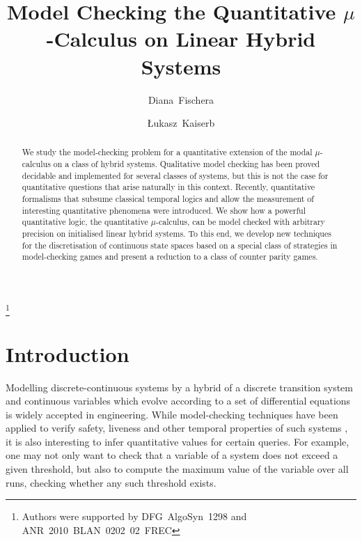 \documentclass[fleqn,envcountsame]{LMCS}
\begin{document}
\title[Model Checking the Quantitative $\mu$-Calculus on
  Linear Hybrid Systems]{Model Checking the Quantitative $\mu$-Calculus on
  Linear Hybrid Systems}
\author[D.~Fischer]{Diana~Fischer\rsuper a}
\address{{\lsuper a}Mathematische Grundlagen der Informatik, RWTH Aachen University}

\author[\L.~~Kaiser]{\L{}ukasz~Kaiser\rsuper b}
\address{{\lsuper b}LIAFA, CNRS \& Universit{\'e} Paris Diderot -- Paris 7}

\thanks{Authors were supported by DFG~AlgoSyn~1298 and
  ANR~2010~BLAN~0202~02~FREC}


\begin{abstract}
We study the model-checking problem for a quantitative
extension of the modal $\mu$-calculus on a class of hybrid systems.
Qualitative model checking has been proved decidable and implemented for
several classes of systems, but this is not the case for quantitative
questions that arise naturally in this context. Recently, quantitative
formalisms that subsume classical temporal logics and allow
the measurement of interesting quantitative phenomena were introduced.
We show how a powerful quantitative logic, the quantitative $\mu$-calculus, can
be model checked with arbitrary precision on initialised linear hybrid systems.
To this end, we develop new techniques for the discretisation of continuous
state spaces based on a special class of strategies in model-checking games
and present a reduction to a class of counter parity games.
\end{abstract}

\maketitle

\section{Introduction}

Modelling discrete-continuous systems by a hybrid of a discrete transition
system and continuous variables which evolve according to a set of
differential equations is widely accepted in engineering.
While model-checking techniques have been applied to verify safety, liveness
and other temporal properties of such systems \cite{ACHHHNOSY95,HHM99,HKPV95},
it is also interesting to infer quantitative values for certain queries.
For example, one may not only want to check that a variable of a system
does not exceed a given threshold, but also to compute the maximum value
of the variable over all runs, checking whether any such threshold exists.
\end{document}
